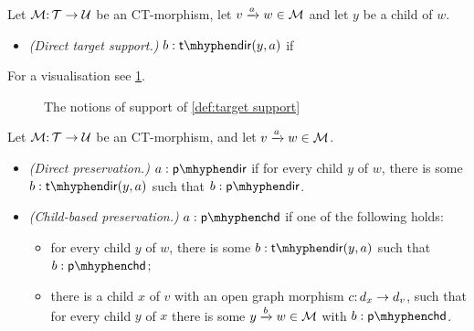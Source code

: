 \begin{definition}\label{def:target support}
Let ${\mathcal{M}}{:}\, {\mathcal{T}}\rightarrow{\mathcal{U}}$ be an CT-morphism, let ${v}\xrightarrow{a}{w}\in{\mathcal{M}}$ and let $y$ be a child of $w$.
\begin{itemize}[topsep=\smallskipamount]
\item \emph{(Direct target support.)} $b:\tdir{y,a}$ if 
\end{itemize}
\end{definition}
%
For a visualisation see \cref{fig:target-saturation}.
%
\begin{figure}
	
	\caption{The notions of support of \cref{def:target support}}
	\label{fig:target-saturation}
\end{figure}

\begin{definition}
Let ${\mathcal{M}}{:}\, {\mathcal{T}}\rightarrow{\mathcal{U}}$ be an CT-morphism, and let ${v}\xrightarrow{a}{w}\in{\mathcal{M}}$.
\begin{itemize}[topsep=\smallskipamount]
\item \emph{(Direct preservation.)} $a:\pdir$ if for every child $y$ of $w$, there is some $b:\tdir{y,a}$ such that $b:\pdir$.
\item \emph{(Child-based preservation.)} $a:\pchd$ if one of the following holds:
\begin{itemize}
\item for every child $y$ of $w$, there is some $b:\tdir{y,a}$ such that $b:\pchd$;
\item there is a child $x$ of $v$ with an open graph morphism $c{:}\, d_x\rightarrow d_v$, such that for every child $y$ of $x$ there is some ${y}\xrightarrow{b}{w}\in{\mathcal{M}}$ with $b:\pchd$.
\end{itemize}
\end{itemize}
\end{definition}

